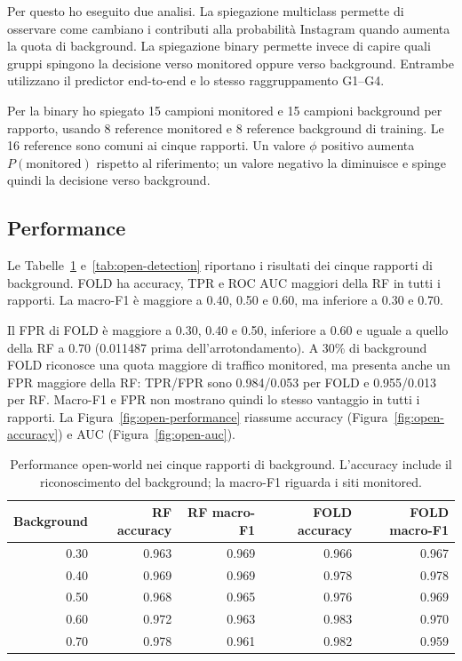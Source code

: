\documentclass[11pt,a4paper]{article}
\begin{document}
Per questo ho eseguito due analisi. La spiegazione multiclass permette di osservare come cambiano i contributi alla probabilità Instagram quando aumenta la quota di background. La spiegazione binary permette invece di capire quali gruppi spingono la decisione verso monitored oppure verso background. Entrambe utilizzano il predictor end-to-end e lo stesso raggruppamento G1--G4.

Per la binary ho spiegato 15 campioni monitored e 15 campioni background per rapporto, usando 8 reference monitored e 8 reference background di training. Le 16 reference sono comuni ai cinque rapporti. Un valore $\phi$ positivo aumenta $P(\mathrm{monitored})$ rispetto al riferimento; un valore negativo la diminuisce e spinge quindi la decisione verso background.

\subsection{Performance}
Le Tabelle~\ref{tab:open-performance} e~\ref{tab:open-detection} riportano i risultati dei cinque rapporti di background. FOLD ha accuracy, TPR e ROC AUC maggiori della RF in tutti i rapporti. La macro-F1 è maggiore a 0.40, 0.50 e 0.60, ma inferiore a 0.30 e 0.70.

Il FPR di FOLD è maggiore a 0.30, 0.40 e 0.50, inferiore a 0.60 e uguale a quello della RF a 0.70 (0.011487 prima dell'arrotondamento). A 30\% di background FOLD riconosce una quota maggiore di traffico monitored, ma presenta anche un FPR maggiore della RF: TPR/FPR sono 0.984/0.053 per FOLD e 0.955/0.013 per RF. Macro-F1 e FPR non mostrano quindi lo stesso vantaggio in tutti i rapporti. La Figura~\ref{fig:open-performance} riassume accuracy (Figura~\ref{fig:open-accuracy}) e AUC (Figura~\ref{fig:open-auc}).

\begin{table}[htbp]
\centering\small
\caption{Performance open-world nei cinque rapporti di background. L'accuracy include il riconoscimento del background; la macro-F1 riguarda i siti monitored.}
\label{tab:open-performance}
\begin{tabular}{rrrrr}
\toprule
Background & RF accuracy & RF macro-F1 & FOLD accuracy & FOLD macro-F1 \\
\midrule
0.30 & 0.963 & 0.969 & 0.966 & 0.967 \\
0.40 & 0.969 & 0.969 & 0.978 & 0.978 \\
0.50 & 0.968 & 0.965 & 0.976 & 0.969 \\
0.60 & 0.972 & 0.963 & 0.983 & 0.970 \\
0.70 & 0.978 & 0.961 & 0.982 & 0.959 \\
\bottomrule
\end{tabular}
\end{table}
\end{document}
